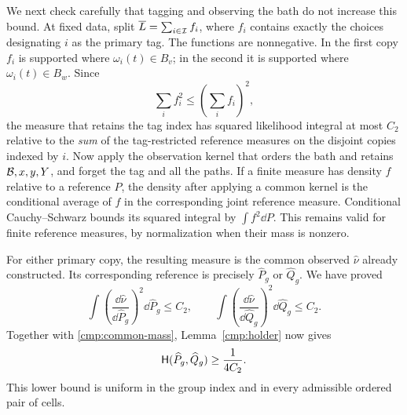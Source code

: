 We next check carefully that tagging and observing the bath do not increase
this bound. At fixed data, split $\overline L=\sum_{i\in\mathcal I}f_i$, where
$f_i$ contains exactly the choices designating $i$ as the primary tag.
The functions are nonnegative. In the first copy $f_i$ is supported where
$\omega_i(t)\in B_v$; in the second it is supported where
$\omega_i(t)\in B_w$. Since
\[
 \sum_i f_i^2\le\left(\sum_i f_i\right)^2,
\]
the measure that retains the tag index has squared likelihood integral at
most $C_2$ relative to the \emph{sum} of the tag-restricted reference
measures on the disjoint copies indexed by $i$. Now apply the observation kernel that orders the bath and retains
$\mathcal B,x,y,Y$, and forget the tag and all the paths. If a finite measure has
density $f$ relative to a reference $P$, the density after applying a common
kernel is the conditional average of $f$ in the corresponding joint
reference measure. Conditional Cauchy--Schwarz bounds its squared integral
by $\int f^2\dd P$. This remains valid for finite reference measures,
by normalization when their mass is nonzero.

For either primary copy, the resulting measure is the common observed
$\widehat\nu$ already constructed. Its corresponding reference is precisely
$\widehat P_g$ or $\widehat Q_g$. We have proved
\begin{equation}\label{cmp:observed-second-moments}
 \int\left(\frac{\dd\widehat\nu}{\dd\widehat P_g}\right)^2
                \dd\widehat P_g\le C_2,
 \qquad
 \int\left(\frac{\dd\widehat\nu}{\dd\widehat Q_g}\right)^2
                \dd\widehat Q_g\le C_2.
\end{equation}
Together with \eqref{cmp:common-mass}, Lemma~\ref{cmp:holder} now gives
\begin{equation}\label{cmp:one-group-gain}
 \mathsf H(\widehat P_g,\widehat Q_g)\ge\frac1{4C_2}.
\end{equation}
This lower bound is uniform in the group index and in every admissible
ordered pair of cells.

